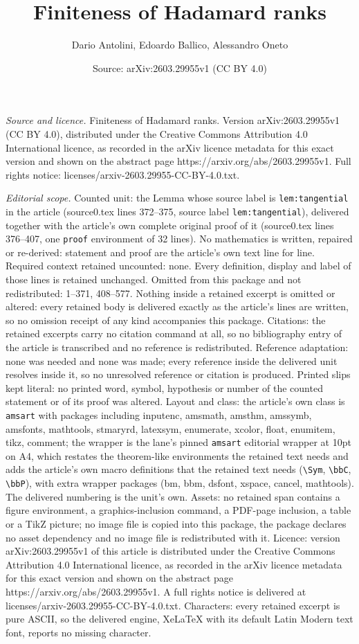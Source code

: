 \documentclass[10pt,a4paper]{amsart}
\title[Finiteness of Hadamard ranks]{Finiteness of Hadamard ranks}
\author{Dario Antolini, Edoardo Ballico, Alessandro Oneto}
\date{Source: arXiv:2603.29955v1 (CC BY 4.0)}
\begin{document}
\maketitle

\noindent\emph{Source and licence.} Finiteness of Hadamard ranks. Version arXiv:2603.29955v1 (CC BY 4.0), distributed under the Creative Commons Attribution 4.0 International licence, as recorded in the arXiv licence metadata for this exact version and shown on the abstract page https://arxiv.org/abs/2603.29955v1. Full rights notice: licenses/arxiv-2603.29955-CC-BY-4.0.txt.\par\smallskip

\noindent\textit{Editorial scope.} Counted unit: the Lemma whose source label is \texttt{lem:tangential} in the article (source0.tex lines 372--375, source label \texttt{lem:tangential}), delivered together with the article's own complete original proof of it (source0.tex lines 376--407, one \texttt{proof} environment of 32 lines). No mathematics is written, repaired or re-derived: statement and proof are the article's own text line for line. Required context retained uncounted: none. Every definition, display and label of those lines is retained unchanged. Omitted from this package and not redistributed: 1--371, 408--577. Nothing inside a retained excerpt is omitted or altered: every retained body is delivered exactly as the article's lines are written, so no omission receipt of any kind accompanies this package. Citations: the retained excerpts carry no citation command at all, so no bibliography entry of the article is transcribed and no reference is redistributed. Reference adaptation: none was needed and none was made; every reference inside the delivered unit resolves inside it, so no unresolved reference or citation is produced. Printed slips kept literal: no printed word, symbol, hypothesis or number of the counted statement or of its proof was altered. Layout and class: the article's own class is \texttt{amsart} with packages including inputenc, amsmath, amsthm, amssymb, amsfonts, mathtools, stmaryrd, latexsym, enumerate, xcolor, float, enumitem, tikz, comment; the wrapper is the lane's pinned \texttt{amsart} editorial wrapper at 10pt on A4, which restates the theorem-like environments the retained text needs and adds the article's own macro definitions that the retained text needs (\texttt{\textbackslash Sym}, \texttt{\textbackslash bbC}, \texttt{\textbackslash bbP}), with extra wrapper packages (bm, bbm, dsfont, xspace, cancel, mathtools). The delivered numbering is the unit's own. Assets: no retained span contains a figure environment, a graphics-inclusion command, a PDF-page inclusion, a table or a TikZ picture; no image file is copied into this package, the package declares no asset dependency and no image file is redistributed with it. Licence: version arXiv:2603.29955v1 of this article is distributed under the Creative Commons Attribution 4.0 International licence, as recorded in the arXiv licence metadata for this exact version and shown on the abstract page https://arxiv.org/abs/2603.29955v1. A full rights notice is delivered at licenses/arxiv-2603.29955-CC-BY-4.0.txt. Characters: every retained excerpt is pure ASCII, so the delivered engine, XeLaTeX with its default Latin Modern text font, reports no missing character.
\end{document}
